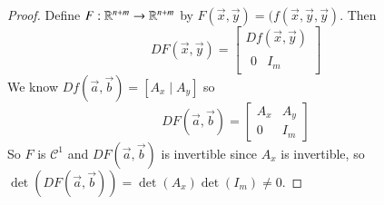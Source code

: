 \begin{proof}
    Define $F:\mathbb R^{n+m}\rightarrow \mathbb R^{n+m}$ by $F(\vec{x},\vec{y}) = (f(\vec{x},\vec{y},\vec{y})$. Then $$DF(\vec{x},\vec{y}) = \begin{bmatrix} Df(\vec{x},\vec{y}) \\ \hline \begin{array}{c|c} 0 & I_m \end{array}\end{bmatrix}$$ We know $Df(\vec{a},\vec{b}) = [A_x\;\vert\;A_y]$ so $$DF(\vec{a},\vec{b}) = \begin{bmatrix} A_x & A_y \\ 0 & I_m\end{bmatrix}$$ So $F$ is $\mathcal{C}^1$ and $DF(\vec{a},\vec{b})$ is invertible since $A_x$ is invertible, so $\det(DF(\vec{a},\vec{b})) = \det(A_x)\det(I_m) \neq 0$. 


\end{proof}
